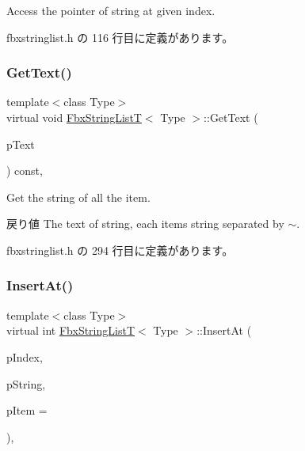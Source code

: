 Access the pointer of string at given index. 



 fbxstringlist.\+h の 116 行目に定義があります。

\mbox{\label{class_fbx_string_list_t_a3b88147898d42dd276a73ff380dbe8d8}} 
\subsubsection{\texorpdfstring{Get\+Text()}{GetText()}}
{\footnotesize\ttfamily template$<$class Type$>$ \\
virtual void \hyperlink{class_fbx_string_list_t}{Fbx\+String\+ListT}$<$ Type $>$\+::Get\+Text (\begin{DoxyParamCaption}\item[{\hyperlink{class_fbx_string}{Fbx\+String} \&}]{p\+Text }\end{DoxyParamCaption}) const\hspace{0.3cm}{\ttfamily [inline]}, {\ttfamily [virtual]}}

Get the string of all the item. \begin{DoxyReturn}{戻り値}
The text of string, each item\textquotesingle{}s string separated by \textquotesingle{}$\sim$\textquotesingle{}. 
\end{DoxyReturn}


 fbxstringlist.\+h の 294 行目に定義があります。

\mbox{\label{class_fbx_string_list_t_ad736ea0d13e3dd02874e8dff83ff41db}} 
\subsubsection{\texorpdfstring{Insert\+At()}{InsertAt()}}
{\footnotesize\ttfamily template$<$class Type$>$ \\
virtual int \hyperlink{class_fbx_string_list_t}{Fbx\+String\+ListT}$<$ Type $>$\+::Insert\+At (\begin{DoxyParamCaption}\item[{int}]{p\+Index,  }\item[{const char $\ast$}]{p\+String,  }\item[{Fbx\+Handle}]{p\+Item = {} }\end{DoxyParamCaption})\hspace{0.3cm}{\ttfamily [inline]}, {\ttfamily [virtual]}}



